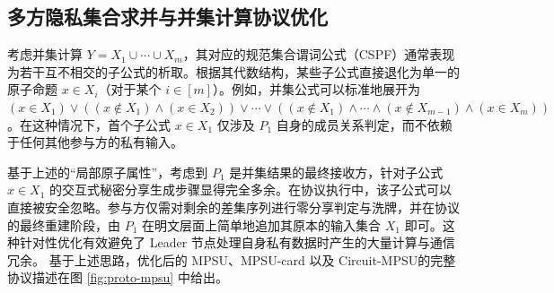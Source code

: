 \subsection{多方隐私集合求并与并集计算协议优化}

考虑并集计算 $Y = X_1 \cup \cdots \cup X_m$，其对应的规范集合谓词公式（CSPF）通常表现为若干互不相交的子公式的析取。根据其代数结构，某些子公式直接退化为单一的原子命题 $x \in X_i$（对于某个 $i \in [m]$）。例如，并集公式可以标准地展开为 $(x \in X_1) \lor ((x \notin X_1) \land (x \in X_2)) \lor \cdots \lor ((x \notin X_1) \land \cdots \land (x \notin X_{m-1}) \land (x \in X_m))$。在这种情况下，首个子公式 $x \in X_1$ 仅涉及 $P_1$ 自身的成员关系判定，而不依赖于任何其他参与方的私有输入。

基于上述的“局部原子属性”，考虑到 $P_1$ 是并集结果的最终接收方，针对子公式 $x \in X_1$ 的交互式秘密分享生成步骤显得完全多余。在协议执行中，该子公式可以直接被安全忽略。参与方仅需对剩余的差集序列进行零分享判定与洗牌，并在协议的最终重建阶段，由 $P_1$ 在明文层面上简单地追加其原本的输入集合 $X_1$ 即可。这种针对性优化有效避免了 Leader 节点处理自身私有数据时产生的大量计算与通信冗余。
基于上述思路，优化后的 MPSU、MPSU-card 以及 Circuit-MPSU的完整协议描述在图 \ref{fig:proto-mpsu} 中给出。

